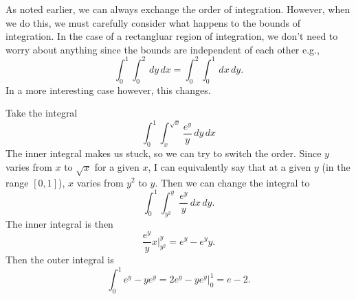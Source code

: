 As noted earlier, we can always exchange the order of integration. However, when we do this, we must carefully consider what happens to the bounds of integration. In the case of a rectangluar region of integration, we don't need to worry about anything since the bounds are independent of each other e.g., 
\[ \int_0^1 \int_0^2 \,dy\,dx = \int_0^2 \int_0^1\,dx\,dy. \]
In a more interesting case however, this changes.

\bex
Take the integral
\[ \int_0^1 \int_x^{\sqrt{x}} \frac{e^y}y\,dy\,dx \]
The inner integral makes us stuck, so we can try to switch the order. Since $y$ varies from $x$ to $\sqrt{x}$ for a given $x$, I can equivalently say that at a given $y$ (in the range $[0,1]$), $x$ varies from $y^2$ to $y$. Then we can change the integral to
\[ \int_0^1 \int_{y^2}^y \frac{e^y}{y}\,dx\,dy. \]
The inner integral is then
\[ \frac{e^y}yx\bigg|_{y^2}^y = e^y - e^yy. \]
Then the outer integral is 
\[ \int_0^1 e^y - ye^y = 2e^y - ye^y \bigg|_0^1 = e-2. \]
\eex
